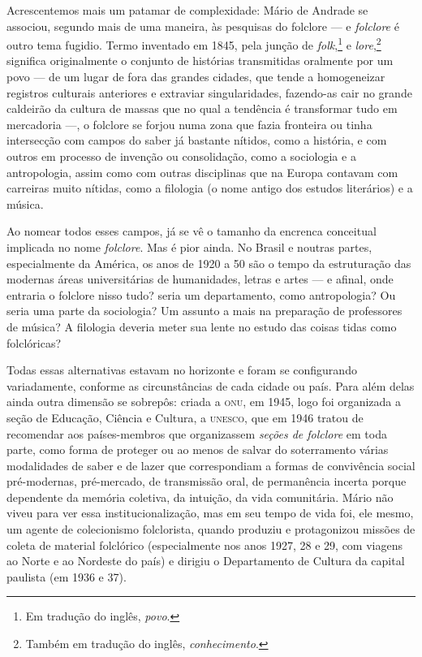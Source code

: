 Acrescentemos mais um patamar de complexidade: Mário de Andrade se associou, 
segundo mais de uma maneira, às pesquisas
do folclore --- e \textit{folclore} é outro tema fugidio. Termo inventado em
1845, pela junção de \textit{folk},\footnote{Em tradução do inglês, \textit{povo}.} e \textit{lore},\footnote{Também em tradução do inglês, \textit{conhecimento}.}
significa originalmente o conjunto de histórias transmitidas
oralmente por um povo --- de um lugar de fora das grandes
cidades, que tende a homogeneizar registros culturais
anteriores e extraviar singularidades, fazendo-as cair no grande
caldeirão da cultura de massas que no qual a tendência é transformar tudo em
mercadoria ---, o folclore se forjou numa zona que fazia fronteira ou
tinha intersecção com campos do saber já bastante nítidos, como a
história, e com outros em processo de invenção ou consolidação, como a
sociologia e a antropologia, assim como com outras disciplinas que na
Europa contavam com carreiras muito nítidas, como a filologia (o nome
antigo dos estudos literários) e a música.

Ao nomear todos esses campos, já se vê o tamanho da encrenca conceitual
implicada no nome \textit{folclore}. Mas é pior ainda. No Brasil e noutras
partes, especialmente da América, os anos de 1920 a 50 são o tempo da
estruturação das modernas áreas universitárias de humanidades, letras e
artes --- e afinal, onde entraria o folclore nisso tudo? seria um
departamento, como antropologia? Ou seria uma parte da sociologia? Um
assunto a mais na preparação de professores de música? A filologia
deveria meter sua lente no estudo das coisas tidas como folclóricas?

Todas essas alternativas estavam no horizonte e foram se configurando
variadamente, conforme as circunstâncias de cada cidade ou país. Para
além delas ainda outra dimensão se sobrepôs: criada a \textsc{onu}, em 1945, logo
foi organizada a seção de Educação, Ciência e Cultura, a \textsc{unesco}, que em
1946 tratou de recomendar aos países-membros que organizassem \textit{seções
de folclore} em toda parte, como forma de proteger ou ao menos de
salvar do soterramento várias modalidades de saber e de lazer que
correspondiam a formas de convivência social pré-modernas, pré-mercado,
de transmissão oral, de permanência incerta porque dependente da memória
coletiva, da intuição, da vida comunitária. Mário não viveu para ver
essa institucionalização, mas em seu tempo de vida foi, ele mesmo, um
agente de colecionismo folclorista, quando produziu e protagonizou
missões de coleta de material folclórico (especialmente nos anos 1927,
28 e 29, com viagens ao Norte e ao Nordeste do país) e dirigiu o
Departamento de Cultura da capital paulista (em 1936 e 37).

